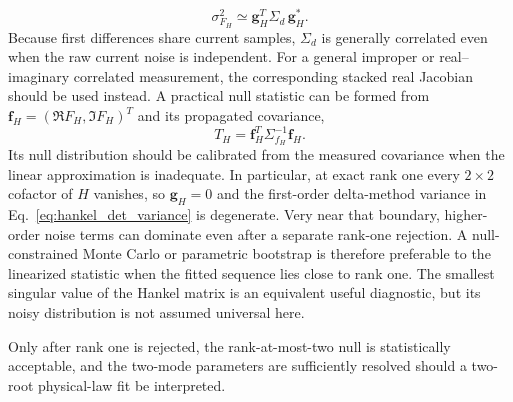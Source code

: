 \documentclass[11pt]{article}
\begin{document}
\begin{equation}
\boxed{\sigma_{F_H}^2\simeq \mathbf g_H^{T}\Sigma_d\,\mathbf g_H^*.}
\label{eq:hankel_det_variance}
\end{equation}
Because first differences share current samples, $\Sigma_d$ is generally correlated even when the raw current noise is independent. For a general improper or real--imaginary correlated measurement, the corresponding stacked real Jacobian should be used instead. A practical null statistic can be formed from $\mathbf f_H=(\Re F_H,\Im F_H)^T$ and its propagated covariance,
\begin{equation}
\boxed{T_H=\mathbf f_H^T\Sigma_{f_H}^{-1}\mathbf f_H.}
\label{eq:hankel_det_stat}
\end{equation}
Its null distribution should be calibrated from the measured covariance when the linear approximation is inadequate. In particular, at exact rank one every $2\times2$ cofactor of $H$ vanishes, so $\mathbf g_H=0$ and the first-order delta-method variance in Eq.~\eqref{eq:hankel_det_variance} is degenerate. Very near that boundary, higher-order noise terms can dominate even after a separate rank-one rejection. A null-constrained Monte Carlo or parametric bootstrap is therefore preferable to the linearized statistic when the fitted sequence lies close to rank one. The smallest singular value of the Hankel matrix is an equivalent useful diagnostic, but its noisy distribution is not assumed universal here.

Only after rank one is rejected, the rank-at-most-two null is statistically acceptable, and the two-mode parameters are sufficiently resolved should a two-root physical-law fit be interpreted.
\end{document}
